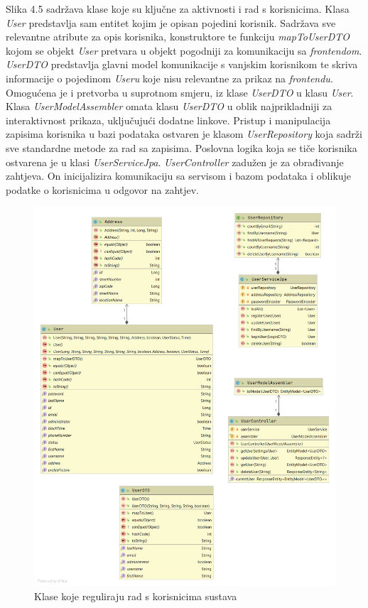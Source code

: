 				\newpage
				
				Slika 4.5 sadržava klase koje su ključne za aktivnosti i rad s korisnicima.
				Klasa \textit{User} predstavlja sam entitet kojim je opisan pojedini korisnik. Sadržava sve relevantne atribute za opis korisnika, konstruktore te funkciju \textit{mapToUserDTO} kojom se objekt \textit{User} pretvara u objekt pogodniji za komunikaciju sa \textit{frontendom}. \textit{UserDTO} predstavlja glavni model komunikacije s vanjskim korisnikom te skriva informacije o pojedinom \textit{Useru} koje nisu relevantne za prikaz na \textit{frontendu}.
				Omogućena je i pretvorba u suprotnom smjeru, iz klase \textit{UserDTO} u klasu \textit{User}. Klasa \textit{UserModelAssembler} omata klasu \textit{UserDTO} u oblik najprikladniji za interaktivnost prikaza, uključujući dodatne linkove. 
				Pristup i manipulacija zapisima korisnika u bazi podataka ostvaren je klasom \textit{UserRepository} koja sadrži sve standardne metode za rad sa zapisima.
				Poslovna logika koja se tiče korisnika ostvarena je u klasi \textit{UserServiceJpa}.
				\textit{UserController} zadužen je za obrađivanje zahtjeva. On inicijalizira komunikaciju sa servisom i bazom podataka i oblikuje podatke o korisnicima u odgovor na zahtjev.
				
				
			
				\begin{figure}[H]
				\includegraphics[scale=0.38]{slike/cs2.png} %
				\centering
				\caption{Klase koje reguliraju rad s korisnicima sustava}
				
				\end{figure}
			
